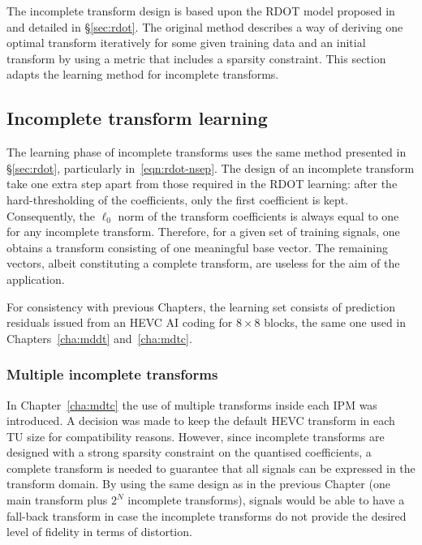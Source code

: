 \documentclass[11pt,a4paper,openright,twoside]{book}
\numberwithin{equation}{section} %
\numberwithin{figure}{section} %
\numberwithin{table}{section} %
\begin{document}
The incomplete transform design is based upon the \ac{RDOT} model proposed
in~\cite{sezer-08-sparse-orthonormal-transforms} and detailed in
\S\ref{sec:rdot}.
The original method describes a way of deriving one optimal transform
iteratively for some given training data and an initial transform by using a
metric that includes a sparsity constraint.
This section adapts the learning method for incomplete transforms.

\subsection{Incomplete transform learning}
\label{sub:it_incomplete_transform_learning}

The learning phase of incomplete transforms uses the same method presented in
\S\ref{sec:rdot}, particularly in~\eqref{eqn:rdot-nsep}.
The design of an incomplete transform take one extra step apart from those
required in the \ac{RDOT} learning:
after the hard-thresholding of the coefficients, only the first coefficient is
kept.
Consequently, the $\ell_0$ norm of the transform coefficients is always equal
to one for any incomplete transform.
Therefore, for a given set of training signals, one obtains a transform
consisting of one meaningful base vector.
The remaining vectors, albeit constituting a complete transform, are useless
for the aim of the application.

For consistency with previous Chapters, the learning set consists of
prediction residuals issued from an \ac{HEVC} \ac{AI} coding for $8\times8$
blocks, the same one used in Chapters~\ref{cha:mddt} and~\ref{cha:mdtc}.

\subsubsection{Multiple incomplete transforms}
\label{ssub:it_multiple_incomplete_transforms}

In Chapter~\ref{cha:mdtc} the use of multiple transforms inside each \ac{IPM}
was introduced.
A decision was made to keep the default \ac{HEVC} transform in each \ac{TU}
size for compatibility reasons.
However, since incomplete transforms are designed with a strong sparsity
constraint on the quantised coefficients, a complete transform is needed to
guarantee that all signals can be expressed in the transform domain.
By using the same design as in the previous Chapter (one main transform plus
$2^N$ incomplete transforms), signals would be able to have a fall-back
transform in case the incomplete transforms do not provide the desired level
of fidelity in terms of distortion.
\end{document}
